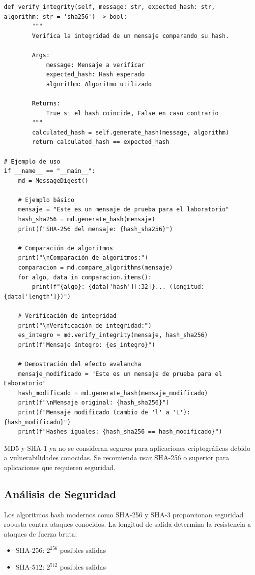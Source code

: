 \documentclass[12pt,a4paper]{article}
\begin{document}
\begin{lstlisting}[caption=Implementación de funciones hash criptográficas]
    def verify_integrity(self, message: str, expected_hash: str, algorithm: str = 'sha256') -> bool:
        """
        Verifica la integridad de un mensaje comparando su hash.
        
        Args:
            message: Mensaje a verificar
            expected_hash: Hash esperado
            algorithm: Algoritmo utilizado
            
        Returns:
            True si el hash coincide, False en caso contrario
        """
        calculated_hash = self.generate_hash(message, algorithm)
        return calculated_hash == expected_hash

# Ejemplo de uso
if __name__ == "__main__":
    md = MessageDigest()
    
    # Ejemplo básico
    mensaje = "Este es un mensaje de prueba para el laboratorio"
    hash_sha256 = md.generate_hash(mensaje)
    print(f"SHA-256 del mensaje: {hash_sha256}")
    
    # Comparación de algoritmos
    print("\nComparación de algoritmos:")
    comparacion = md.compare_algorithms(mensaje)
    for algo, data in comparacion.items():
        print(f"{algo}: {data['hash'][:32]}... (longitud: {data['length']})")
    
    # Verificación de integridad
    print("\nVerificación de integridad:")
    es_integro = md.verify_integrity(mensaje, hash_sha256)
    print(f"Mensaje íntegro: {es_integro}")
    
    # Demostración del efecto avalancha
    mensaje_modificado = "Este es un mensaje de prueba para el Laboratorio"
    hash_modificado = md.generate_hash(mensaje_modificado)
    print(f"\nMensaje original: {hash_sha256}")
    print(f"Mensaje modificado (cambio de 'l' a 'L'): {hash_modificado}")
    print(f"Hashes iguales: {hash_sha256 == hash_modificado}")
\end{lstlisting}

\begin{securitywarning}
    MD5 y SHA-1 ya no se consideran seguros para aplicaciones criptográficas debido a vulnerabilidades conocidas. Se recomienda usar SHA-256 o superior para aplicaciones que requieren seguridad.
\end{securitywarning}

\subsection{Análisis de Seguridad}

\begin{cryptoanalysis}
    Los algoritmos hash modernos como SHA-256 y SHA-3 proporcionan seguridad robusta contra ataques conocidos. La longitud de salida determina la resistencia a ataques de fuerza bruta:
    \begin{itemize}
        \item SHA-256: $2^{256}$ posibles salidas
        \item SHA-512: $2^{512}$ posibles salidas
    \end{itemize}
\end{cryptoanalysis}
\end{document}
